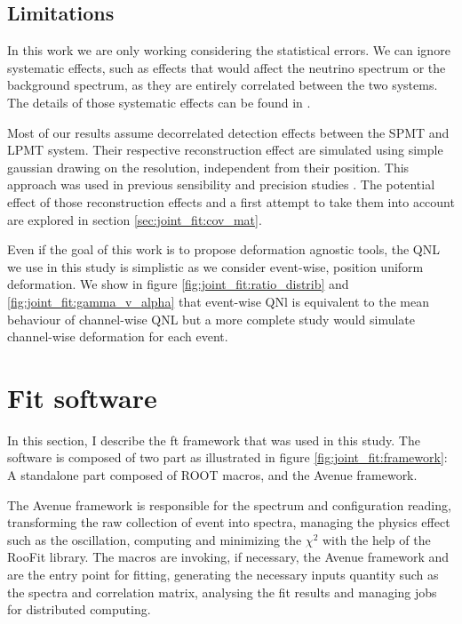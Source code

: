 \documentclass[../main.tex]{subfiles}
\begin{document}
\subsection{Limitations}

In this work we are only working considering the statistical errors. We can ignore systematic effects, such as effects that would affect the neutrino spectrum or the background spectrum, as they are entirely correlated between the two systems. The details of those systematic effects can be found in \cite{juno_collaboration_sub-percent_2022}.

Most of our results assume decorrelated detection effects between the SPMT and LPMT system. Their respective reconstruction effect are simulated using simple gaussian drawing on the resolution, independent from their position. This approach was used in previous sensibility and precision studies \cite{juno_collaboration_sub-percent_2022, abusleme_potential_2024}. The potential effect of those reconstruction effects and a first attempt to take them into account are explored in section \ref{sec:joint_fit:cov_mat}.

Even if the goal of this work is to propose deformation agnostic tools, the QNL we use in this study is simplistic as we consider event-wise, position uniform deformation. We show in figure \ref{fig:joint_fit:ratio_distrib} and \ref{fig:joint_fit:gamma_v_alpha} that event-wise QNl is equivalent to the mean behaviour of channel-wise QNL but a more complete study would simulate channel-wise deformation for each event.

\section{Fit software}
\label{sec:joint_fit:framework}

In this section, I describe the ft framework that was used in this study. The software is composed of two part as illustrated in figure \ref{fig:joint_fit:framework}: A standalone part composed of ROOT \cite{brun_root-projectroot_2022} macros, and the Avenue framework.

The Avenue framework is responsible for the spectrum and configuration reading, transforming the raw collection of event into spectra, managing the physics effect such as the oscillation, computing and minimizing the $\chi^2$ with the help of the RooFit library. The macros are invoking, if necessary, the Avenue framework and are the entry point for fitting, generating the necessary inputs quantity such as the spectra and correlation matrix, analysing the fit results and managing jobs for distributed computing.
\end{document}
